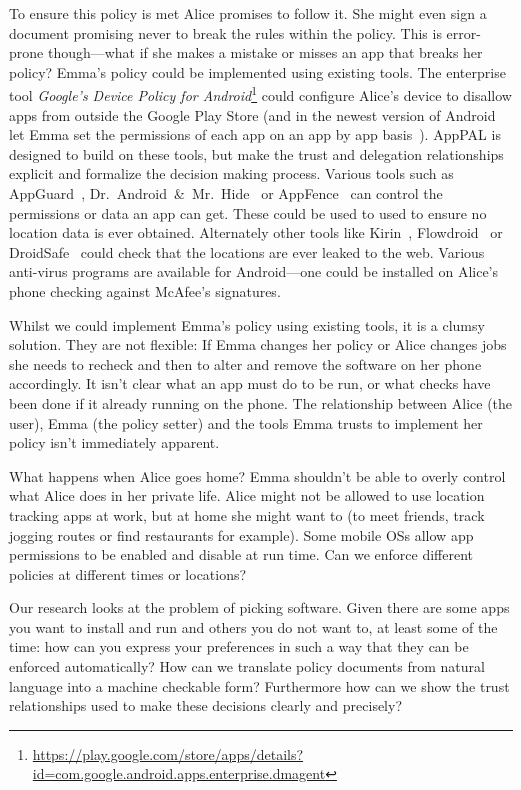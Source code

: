 \documentclass[]{llncs}
\begin{document}
To ensure this policy is met Alice promises to follow it.
She might even sign a document promising never to break the rules within the policy.
This is error-prone though---what if she makes a mistake or misses an app that breaks her policy?
Emma's policy could be implemented using existing tools.
The enterprise tool \emph{Google's Device Policy for Android}\footnote{\url{https://play.google.com/store/apps/details?id=com.google.android.apps.enterprise.dmagent}} could configure Alice's device to disallow apps from outside the Google Play Store (and in the newest version of Android let Emma set the permissions of each app on an app by app basis~\cite{AndroidMPermission:2015uq}).
AppPAL is designed to build on these tools, but make the trust and delegation relationships explicit and formalize the decision making process.
Various tools such as AppGuard~\cite{Backes:2012vm}, Dr.~Android~\&~Mr.~Hide~\cite{Jeon:2012ki} or AppFence~\cite{Hornyack:2011wq} can control the permissions or data an app can get.
These could be used to used to ensure no location data is ever obtained.
Alternately other tools like Kirin~\cite{Enck:2009ko}, Flowdroid~\cite{Fritz:2013vi} or DroidSafe~\cite{Gordon:2015et} could check that the locations are ever leaked to the web.
Various anti-virus programs are available for Android---one could be installed on Alice's phone checking against McAfee's signatures.

Whilst we could implement Emma's policy using existing tools, it is a clumsy solution.
They are not flexible: If Emma changes her policy or Alice changes jobs she needs to recheck and then to alter and remove the software on her phone accordingly.
It isn't clear what an app must do to be run, or what checks have been done if it already running on the phone.
The relationship between Alice (the user), Emma (the policy setter) and the tools Emma trusts to implement her policy isn't immediately apparent.

What happens when Alice goes home?
Emma shouldn't be able to overly control what Alice does in her private life.
Alice might not be allowed to use location tracking apps at work, but at home she might want to (to meet friends, track jogging routes or find restaurants for example).
Some mobile OSs allow app permissions to be enabled and disable at run time.
Can we enforce different policies at different times or locations?

Our research looks at the problem of picking software.
Given there are some apps you want to install and run and others you do not want to, at least some of the time:
  how can you express your preferences in such a way that they can be enforced automatically?
How can we translate policy documents from natural language into a machine checkable form?
Furthermore how can we show the trust relationships used to make these decisions clearly and precisely?
\end{document}
